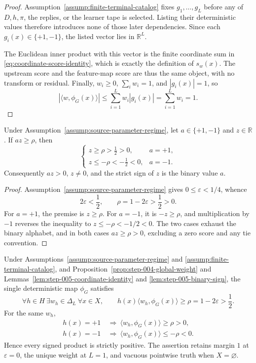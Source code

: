 \begin{proof}
Assumption~\ref{assump:finite-terminal-catalog} fixes
$g_1,\ldots,g_L$ before any of $D,h,\pi$, the replies, or the learner tape
is selected.  Listing their deterministic values therefore introduces none
of those later dependencies.  Since each $g_i(x)\in\{+1,-1\}$, the listed
vector lies in $\mathbb R^L$.

The Euclidean inner product with this vector is the finite coordinate sum in
\eqref{eq:coordinate-score-identity}, which is exactly the definition of
$s_w(x)$.  The upstream score and the feature-map score are thus the same
object, with no transform or residual.  Finally, $w_i\ge0$,
$\sum_iw_i=1$, and $|g_i(x)|=1$, so
\[
|\langle w,\phi_G(x)\rangle|
\le\sum_{i=1}^Lw_i|g_i(x)|
=\sum_{i=1}^Lw_i=1.
\]
\end{proof}

\begin{lemma}
\label{lem:step-005-binary-sign}
Under Assumption~\ref{assump:source-parameter-regime}, let
$a\in\{+1,-1\}$ and $z\in\mathbb R$.  If $az\ge\rho$, then
\[
\begin{cases}
z\ge\rho>\frac12>0,&a=+1,\\[1mm]
z\le-\rho<-\frac12<0,&a=-1.
\end{cases}
\]
Consequently $az>0$, $z\ne0$, and the strict sign of $z$ is the binary
value $a$.
\end{lemma}

\begin{proof}
Assumption~\ref{assump:source-parameter-regime} gives
$0\le\varepsilon<1/4$, whence
\[
2\varepsilon<\frac12,
\qquad \rho=1-2\varepsilon>\frac12>0.
\]
For $a=+1$, the premise is $z\ge\rho$.  For $a=-1$, it is
$-z\ge\rho$, and multiplication by $-1$ reverses the inequality to
$z\le-\rho<-1/2<0$.  The two cases exhaust the binary alphabet, and in
both cases $az\ge\rho>0$, excluding a zero score and any tie convention.
\end{proof}

\begin{proposition}
\label{prop:step-005-exact-representation}
Under Assumptions~\ref{assump:source-parameter-regime} and
\ref{assump:finite-terminal-catalog}, and
Proposition~\ref{prop:step-004-global-weight} and
Lemmas~\ref{lem:step-005-coordinate-identity} and
\ref{lem:step-005-binary-sign}, the single deterministic map $\phi_G$
satisfies
\begin{equation}\label{eq:exact-common-map-margin}
\forall h\in H\ \exists w_h\in\Delta_L\ \forall x\in X,\qquad
h(x)\langle w_h,\phi_G(x)\rangle
\ge\rho=1-2\varepsilon>\frac12.
\end{equation}
For the same $w_h$,
\begin{align*}
h(x)=+1&\ \Longrightarrow\
\langle w_h,\phi_G(x)\rangle\ge\rho>0,\\
h(x)=-1&\ \Longrightarrow\
\langle w_h,\phi_G(x)\rangle\le-\rho<0.
\end{align*}
Hence every signed product is strictly positive.  The assertion retains
margin $1$ at $\varepsilon=0$, the unique weight at $L=1$, and vacuous
pointwise truth when $X=\varnothing$.
\end{proposition}

